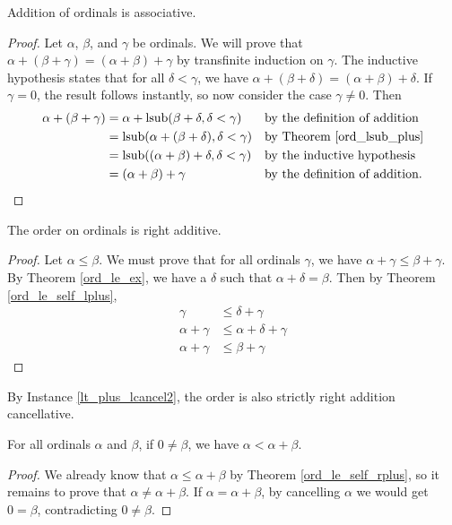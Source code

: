 \documentclass[../../math.tex]{subfiles}
\begin{document}
\begin{instance}
    Addition of ordinals is associative.
\end{instance}
\begin{proof}
    Let $\alpha$, $\beta$, and $\gamma$ be ordinals.  We will prove that $\alpha
    + (\beta + \gamma) = (\alpha + \beta) + \gamma$ by transfinite induction on
    $\gamma$.  The inductive hypothesis states that for all $\delta < \gamma$,
    we have $\alpha + (\beta + \delta) = (\alpha + \beta) + \delta$.  If $\gamma
    = 0$, the result follows instantly, so now consider the case $\gamma \neq
    0$.  Then
    \begin{align*}
        \alpha + (\beta + \gamma)
        &= \alpha + \operatorname{lsub}(\beta + \delta, \delta < \gamma)
            &&\text{by the definition of addition} \\
        &= \operatorname{lsub}(\alpha + (\beta + \delta), \delta < \gamma)
            &&\text{by Theorem \ref{ord_lsub_plus}} \\
        &= \operatorname{lsub}((\alpha + \beta) + \delta, \delta < \gamma)
            &&\text{by the inductive hypothesis} \\
        &= (\alpha + \beta) + \gamma
            &&\text{by the definition of addition.} \\
    \end{align*}
\end{proof}

\begin{instance}
    The order on ordinals is right additive.
\end{instance}
\begin{proof}
    Let $\alpha \leq \beta$.  We must prove that for all ordinals $\gamma$, we
    have $\alpha + \gamma \leq \beta + \gamma$.  By Theorem \ref{ord_le_ex}, we
    have a $\delta$ such that $\alpha + \delta = \beta$.  Then by Theorem
    \ref{ord_le_self_lplus},
    \begin{align*}
        \gamma &\leq \delta + \gamma \\
        \alpha + \gamma &\leq \alpha + \delta + \gamma \\
        \alpha + \gamma &\leq \beta + \gamma
    \end{align*}
\end{proof}

By Instance \ref{lt_plus_lcancel2}, the order is also strictly right addition
cancellative.

\begin{theorem} \label{ord_lt_self_rplus}
    For all ordinals $\alpha$ and $\beta$, if $0 \neq \beta$, we have $\alpha <
    \alpha + \beta$.
\end{theorem}
\begin{proof}
    We already know that $\alpha \leq \alpha + \beta$ by Theorem
    \ref{ord_le_self_rplus}, so it remains to prove that $\alpha \neq \alpha +
    \beta$.  If $\alpha = \alpha + \beta$, by cancelling $\alpha$ we would get
    $0 = \beta$, contradicting $0 \neq \beta$.
\end{proof}
\end{document}
